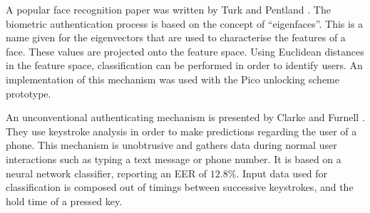 A popular face recognition paper was written by Turk and Pentland \cite{turk1991face}. The biometric authentication process is based on the concept of ``eigenfaces''. This is a name given for the eigenvectors that are used to characterise the features of a face. These values are projected onto the feature space. Using Euclidean distances in the feature space, classification can be performed in order to identify users. An implementation of this mechanism was used with the Pico unlocking scheme prototype.

An unconventional authenticating mechanism is presented by Clarke and Furnell \cite{clarke2007authenticating}. They use keystroke analysis in order to make predictions regarding the user of a phone. This mechanism is unobtrusive and gathers data during normal user interactions such as typing a text message or phone number. It is based on a neural network classifier, reporting an EER of $12.8\%$. Input data used for classification is composed out of timings between successive keystrokes, and the hold time of a pressed key. 
